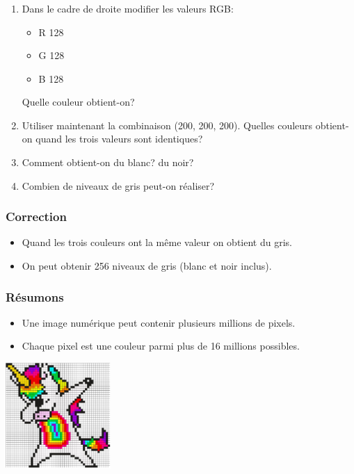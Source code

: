 \documentclass[svgnames,11pt]{beamer}
\begin{document}
\begin{frame}
    \frametitle{}

    \begin{activite}
        \begin{enumerate}
            \item Dans le cadre de droite modifier les valeurs RGB:
                  \begin{itemize}
                      \item R 128
                      \item G 128
                      \item B 128
                  \end{itemize}
                  Quelle couleur obtient-on?
            \item Utiliser maintenant la combinaison (200, 200, 200). Quelles couleurs obtient-on quand les trois valeurs sont identiques?
            \item Comment obtient-on du blanc? du noir?
            \item Combien de niveaux de gris peut-on réaliser?
        \end{enumerate}
    \end{activite}

\end{frame}
\begin{frame}
    \frametitle{Correction}

    \begin{itemize}
        \item Quand les trois couleurs ont la même valeur on obtient du gris.
        \item On peut obtenir 256 niveaux de gris (blanc et noir inclus).
    \end{itemize}

\end{frame}
\begin{frame}
    \frametitle{Résumons}

    \begin{aretenir}[]
    \begin{itemize}
        \item Une image numérique peut contenir plusieurs millions de pixels.
        \item Chaque pixel est une couleur parmi plus de 16 millions possibles.
    \end{itemize}
    \end{aretenir}
\begin{center}
\centering
\includegraphics[width=4cm]{ressources/licorne.jpg}
\end{center}
\end{frame}
\end{document}
